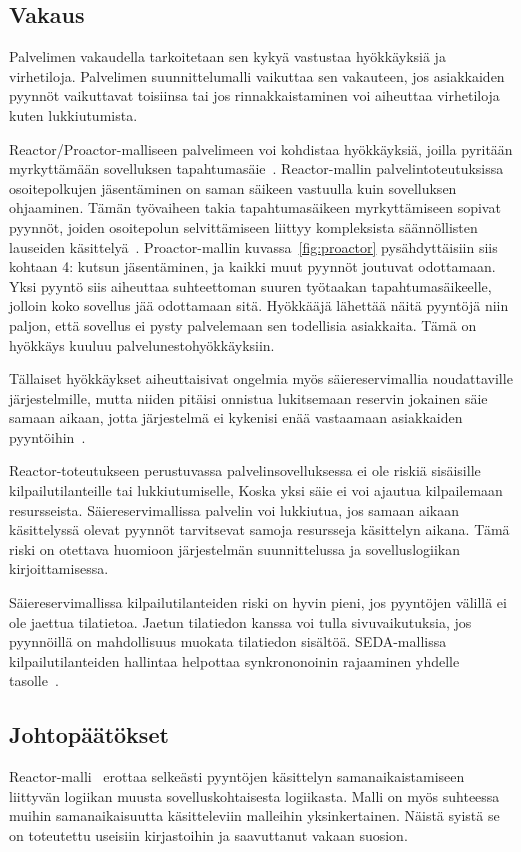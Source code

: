 \documentclass[finnish]{tktltiki2}
\theoremstyle{definition}
\theoremstyle{remark}
\begin{document}
\subsection{Vakaus}
Palvelimen vakaudella tarkoitetaan sen kykyä vastustaa hyökkäyksiä ja
virhetiloja.
Palvelimen suunnittelumalli vaikuttaa sen vakauteen, jos asiakkaiden
pyynnöt vaikuttavat toisiinsa tai jos rinnakkaistaminen voi aiheuttaa virhetiloja kuten
lukkiutumista.

Reactor/Proactor-malliseen palvelimeen voi kohdistaa hyökkäyksiä, joilla pyritään
myrkyttämään sovelluksen tapahtumasäie~\cite{davis_case_2017}. Reactor-mallin palvelintoteutuksissa
osoitepolkujen jäsentäminen on saman säikeen vastuulla kuin sovelluksen ohjaaminen.
Tämän työvaiheen takia
tapahtumasäikeen myrkyttämiseen sopivat pyynnöt,
joiden osoitepolun selvittämiseen liittyy kompleksista
säännöllisten lauseiden käsittelyä~\cite{davis_case_2017}.
Proactor-mallin kuvassa~\ref{fig:proactor} pysähdyttäisiin 
siis kohtaan 4: kutsun jäsentäminen, ja
kaikki muut pyynnöt joutuvat odottamaan.
Yksi pyyntö siis aiheuttaa suhteettoman suuren työtaakan
tapahtumasäikeelle, jolloin koko sovellus jää odottamaan sitä.
Hyökkääjä lähettää näitä pyyntöjä niin paljon, että sovellus
ei pysty palvelemaan sen todellisia asiakkaita. Tämä
on hyökkäys kuuluu palvelunestohyökkäyksiin.

Tällaiset hyökkäykset aiheuttaisivat ongelmia myös säiereservimallia
noudattaville järjestelmille, mutta niiden pitäisi onnistua
lukitsemaan reservin jokainen säie samaan aikaan, jotta
järjestelmä ei kykenisi enää vastaamaan asiakkaiden pyyntöihin~\cite{davis_case_2017}.

Reactor-toteutukseen perustuvassa palvelinsovelluksessa ei ole
riskiä sisäisille kilpailutilanteille tai lukkiutumiselle, Koska
yksi säie ei voi ajautua kilpailemaan resursseista.
Säiereservimallissa palvelin voi lukkiutua, jos samaan aikaan käsittelyssä olevat
pyynnöt tarvitsevat samoja resursseja käsittelyn aikana. Tämä riski on otettava
huomioon järjestelmän suunnittelussa ja sovelluslogiikan kirjoittamisessa.

Säiereservimallissa kilpailutilanteiden riski on hyvin pieni, jos pyyntöjen
välillä ei ole jaettua tilatietoa. Jaetun tilatiedon kanssa voi tulla
sivuvaikutuksia, jos pyynnöillä on mahdollisuus muokata tilatiedon sisältöä.
SEDA-mallissa kilpailutilanteiden hallintaa helpottaa synkrononoinin
rajaaminen yhdelle tasolle~\cite{welsh_seda_2001}.

\subsection{Johtopäätökset}
Reactor-malli~\cite{schmidt_reactor:_1995} erottaa
selkeästi pyyntöjen käsittelyn
samanaikaistamiseen liittyvän
logiikan muusta sovelluskohtaisesta logiikasta.
Malli on myös suhteessa muihin samanaikaisuutta
käsitteleviin malleihin yksinkertainen.
Näistä syistä se on toteutettu useisiin
kirjastoihin ja saavuttanut vakaan suosion.
\end{document}
